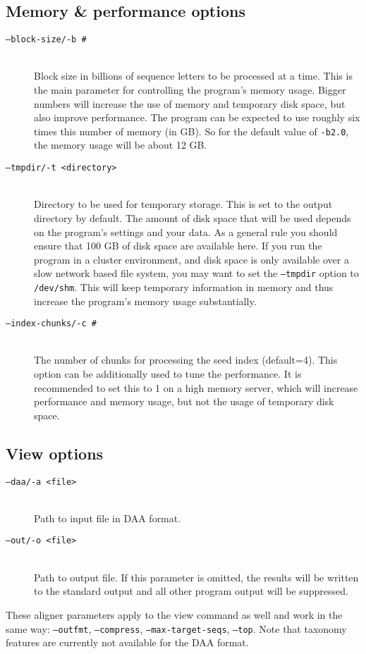 \documentclass[11pt]{article}
\begin{document}
\subsection{Memory \& performance options}
\label{subsec:memory}
\begin{description}
\item[\texttt{--block-size/-b \#}]\hfill\\
Block size in billions of sequence letters to be processed at a time. This is the main parameter for controlling the program's memory usage. Bigger numbers will increase the use of memory and temporary disk space, but also improve performance. The program can be expected to use roughly six times this number of memory (in GB). So for the default value of \texttt{-b2.0}, the memory usage will be about 12 GB.
\item[\texttt{--tmpdir/-t <directory>}]\hfill\\
Directory to be used for temporary storage. This is set to the output directory by default. The amount of disk space that will be used depends on the program's settings and your data. As a general rule you should ensure that 100 GB of disk space are available here. If you run the program in a cluster environment, and disk space is only available over a slow network based file system, you may want to set the \texttt{--tmpdir} option to \texttt{/dev/shm}. This will keep temporary information in memory and thus increase the program's memory usage substantially.
\item[\texttt{--index-chunks/-c \#}]\hfill\\
The number of chunks for processing the seed index (default=4). This option can be additionally used to tune the performance. It is recommended to set this to 1 on a high memory server, which will increase performance and memory usage, but not the usage of temporary disk space.
\end{description}

\subsection{View options}
\begin{description}
\item[\texttt{--daa/-a <file>}]\hfill\\
Path to input file in DAA format.
\item[\texttt{--out/-o <file>}]\hfill\\
Path to output file. If this parameter is omitted, the results will be written to the standard output and all other program output will be suppressed.
\end{description}
These aligner parameters apply to the view command as well and work in the same way: \texttt{--outfmt}, \texttt{--compress}, \texttt{--max-target-seqs}, \texttt{--top}. Note that taxonomy features are currently not available for the DAA format.
\end{document}
